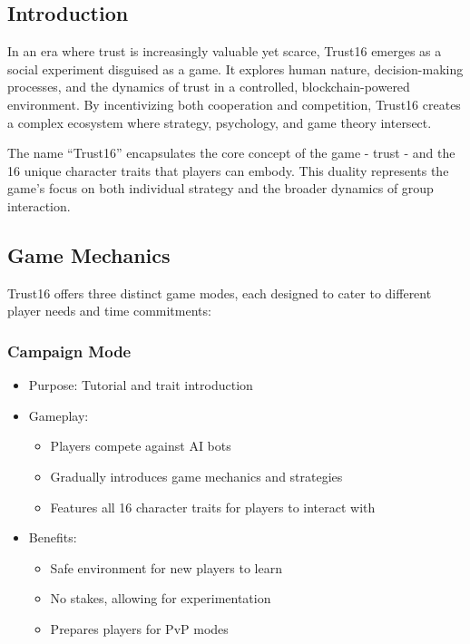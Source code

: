 \documentclass[]{article}
\begin{document}
\hypertarget{introduction}{%
\subsection{Introduction}\label{introduction}}

In an era where trust is increasingly valuable yet scarce, Trust16
emerges as a social experiment disguised as a game. It explores human
nature, decision-making processes, and the dynamics of trust in a
controlled, blockchain-powered environment. By incentivizing both
cooperation and competition, Trust16 creates a complex ecosystem where
strategy, psychology, and game theory intersect.

The name ``Trust16'' encapsulates the core concept of the game - trust -
and the 16 unique character traits that players can embody. This duality
represents the game's focus on both individual strategy and the broader
dynamics of group interaction.

\hypertarget{game-mechanics}{%
\subsection{Game Mechanics}\label{game-mechanics}}

Trust16 offers three distinct game modes, each designed to cater to
different player needs and time commitments:

\hypertarget{campaign-mode}{%
\subsubsection{Campaign Mode}\label{campaign-mode}}

\begin{itemize}
\tightlist
\item
  Purpose: Tutorial and trait introduction
\item
  Gameplay:

  \begin{itemize}
  \tightlist
  \item
    Players compete against AI bots
  \item
    Gradually introduces game mechanics and strategies
  \item
    Features all 16 character traits for players to interact with
  \end{itemize}
\item
  Benefits:

  \begin{itemize}
  \tightlist
  \item
    Safe environment for new players to learn
  \item
    No stakes, allowing for experimentation
  \item
    Prepares players for PvP modes
  \end{itemize}
\end{itemize}
\end{document}
